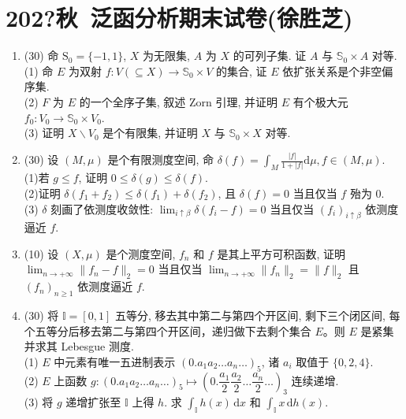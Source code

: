 \section{202?秋\ 泛函分析期末试卷(徐胜芝)}
\begin{enumerate}[label=T\arabic*]
\item (30) 命 $\mathrm{S}_0=\{-1,1\}$, $X$ 为无限集, 
$A$ 为 $X$ 的可列子集. 证 $A$ 与 $\mathbb{S}_0 \times A$ 对等.\\
(1) 命 $E$ 为双射 $f\colon V(\subseteq X) \rightarrow \mathbb{S}_0 \times V$ 的集合, 证 $E$ 依扩张关系是个非空偏序集.\\
(2) $F$ 为 $E$ 的一个全序子集, 叙述 Zorn 引理, 并证明 $E$ 有个极大元 $f_0\colon V_0 \rightarrow \mathbb{S}_0 \times V_0$.\\
(3) 证明 $X \backslash V_0$ 是个有限集, 并证明 $X$ 与 $\mathbb{S}_0 \times X$ 对等.

\item (30) 设 $(M, \mu)$ 是个有限测度空间, 命 $\displaystyle \delta(f)=\int_M \frac{|f|}{1+|f|} \mathrm{d} \mu, f \in(M, \mu)$.\\
(1)若 $g \leq f$, 证明 $0 \leq \delta(g) \leq \delta(f)$.\\
(2)证明 $\delta(f_1+f_2) \leq \delta(f_1)+\delta(f_2)$, 且 $\delta(f)=0$ 当且仅当 $f$ 殆为 $0$.\\
(3) $\delta$ 刻画了依测度收敛性: $\lim_{i \uparrow \beta} \delta(f_i-f)=0$ 当且仅当 $(f_i)_{i \uparrow \beta}$ 依测度逼近 $f$.

\item (10) 设 $(X, \mu)$ 是个测度空间, $f_n$ 和 $f$ 是其上平方可积函数, 
证明 $\lim _{n \rightarrow+\infty}\|f_n-f\|_2=0$ 
当且仅当 $\lim _{n \rightarrow+\infty}\|f_n\|_2=\|f\|_2$ 
且 $(f_n)_{n \geq 1}$ 依测度逼近 $f$.

\item (30) 将 $\mathbb{I}=[0,1]$ 五等分, 移去其中第二与第四个开区间, 剩下三个闭区间, 
每个五等分后移去第二与第四个开区间，递归做下去剩个集合 $E$。则 $E$ 是紧集并求其 Lebesgue 测度.\\
(1) $E$ 中元素有唯一五进制表示 $(0 . a_1 a_2 \ldots a_n \ldots)_5$, 诸 $a_i$ 取值于 $\{0,2,4\}$.\\
(2) $E$ 上函数 $g\colon(0 . a_1 a_2 \ldots a_n \ldots)_5 \mapsto\left(0 . \dfrac{a_1}{2} \dfrac{a_2}{2} \ldots \dfrac{a_n}{2} \ldots\right)_3$ 连续递增.\\
(3) 将 $g$ 递增扩张至 $\mathbb{I}$ 上得 $h$. 
求 $\displaystyle \int_{\mathbb{I}} h(x) \,\mathrm{d} x$ 
和 $\displaystyle \int_{\mathbb{I}} x \,\mathrm{d} h(x)$.
\end{enumerate}